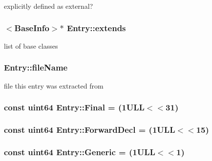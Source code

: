 explicitly defined as external? 

\hypertarget{class_entry_a22b4c7b8255e183b68c49d5bd9f04017}{}
\subsubsection[{extends}]{$<${\bf Base\+Info}$>$$\ast$ Entry\+::extends}\label{class_entry_a22b4c7b8255e183b68c49d5bd9f04017}


list of base classes 

\hypertarget{class_entry_a736f1dfadfe0c0fabb022c533aa27fdc}{}
\subsubsection[{file\+Name}]{ Entry\+::file\+Name}\label{class_entry_a736f1dfadfe0c0fabb022c533aa27fdc}


file this entry was extracted from 

\hypertarget{class_entry_a05e41a105992fc7549e7694fcfefb5cc}{}
\subsubsection[{Final}]{\setlength{\rightskip}{0pt plus 5cm}const {\bf uint64} Entry\+::\+Final = (1\+U\+L\+L$<$$<$31)\hspace{0.3cm}{\ttfamily [static]}}\label{class_entry_a05e41a105992fc7549e7694fcfefb5cc}
\hypertarget{class_entry_acd4eca9e63c0bad3da6b88499d5ebc3e}{}
\subsubsection[{Forward\+Decl}]{\setlength{\rightskip}{0pt plus 5cm}const {\bf uint64} Entry\+::\+Forward\+Decl = (1\+U\+L\+L$<$$<$15)\hspace{0.3cm}{\ttfamily [static]}}\label{class_entry_acd4eca9e63c0bad3da6b88499d5ebc3e}
\hypertarget{class_entry_ae02e62d1c60a9a43bed5d691b5a048b8}{}
\subsubsection[{Generic}]{\setlength{\rightskip}{0pt plus 5cm}const {\bf uint64} Entry\+::\+Generic = (1\+U\+L\+L$<$$<$1)\hspace{0.3cm}{\ttfamily [static]}}\label{class_entry_ae02e62d1c60a9a43bed5d691b5a048b8}
\hypertarget{class_entry_aecb46e9992b0cf2e49a14f2eaf74d60b}{}
